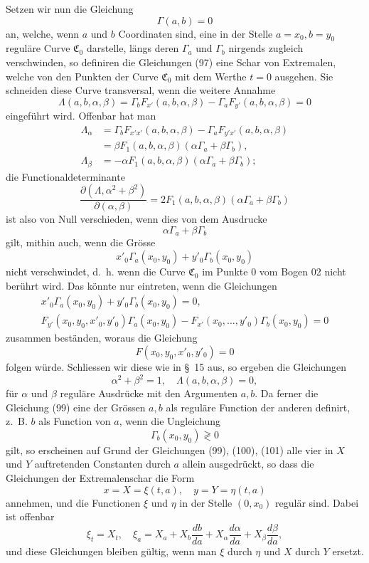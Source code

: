 \documentclass[11pt,a4paper,leqno]{article}
\begin{document}
Setzen wir nun die Gleichung
\begin{equation}\tag{99}
\Gamma(a,b)=0
\end{equation}
an, welche, wenn $a$ und $b$ Coordinaten sind, eine in der Stelle $a=x_0,b=y_0$ reguläre Curve $\mathfrak C_0$ darstelle, längs deren $\Gamma_a$ und $\Gamma_b$ nirgends zugleich verschwinden, so definiren die Gleichungen (97) eine Schar von Extremalen, welche von den Punkten der Curve $\mathfrak C_0$ mit dem Werthe $t=0$ ausgehen. Sie schneiden diese Curve transversal, wenn die weitere Annahme
\begin{equation}\tag{100}
\Lambda(a,b,\alpha,\beta)=\Gamma_bF_{x'}(a,b,\alpha,\beta)-\Gamma_aF_{y'}(a,b,\alpha,\beta)=0
\end{equation}
eingeführt wird. Offenbar hat man
\[
\begin{aligned}
\Lambda_{\alpha}
&=\Gamma_bF_{x'x'}(a,b,\alpha,\beta)-\Gamma_aF_{y'x'}(a,b,\alpha,\beta)\\
&=\beta F_1(a,b,\alpha,\beta)(\alpha\Gamma_a+
\beta\Gamma_b),\\
\Lambda_{\beta}
&=-\alpha F_1(a,b,\alpha,\beta)(\alpha\Gamma_a+
\beta\Gamma_b);
\end{aligned}
\]
die Functionaldeterminante
\[
\frac{\partial(\Lambda,\alpha^2+\beta^2)}{\partial(\alpha,\beta)}
=2F_1(a,b,\alpha,\beta)(\alpha\Gamma_a+
\beta\Gamma_b)
\]
ist also von Null verschieden, wenn dies von dem Ausdrucke
\[
\alpha\Gamma_a+\beta\Gamma_b
\]
gilt, mithin auch, wenn die Grösse
\[
x'_0\Gamma_a(x_0,y_0)+y'_0\Gamma_b(x_0,y_0)
\]
nicht verschwindet, d.~h. wenn die Curve $\mathfrak C_0$ im Punkte 0 vom Bogen 02 nicht berührt wird. Das könnte nur eintreten, wenn die Gleichungen
\[
\begin{gathered}
x'_0\Gamma_a(x_0,y_0)+y'_0\Gamma_b(x_0,y_0)=0,\\
F_{y'}(x_0,y_0,x'_0,y'_0)\Gamma_a(x_0,y_0)
-F_{x'}(x_0,\ldots,y'_0)\Gamma_b(x_0,y_0)=0
\end{gathered}
\]
zusammen beständen, woraus die Gleichung
\[
F(x_0,y_0,x'_0,y'_0)=0
\]
folgen würde. Schliessen wir diese wie in \S~15 aus, so ergeben die Gleichungen
\begin{equation}\tag{101}
\alpha^2+\beta^2=1,
\quad
\Lambda(a,b,\alpha,\beta)=0,
\end{equation}
für $\alpha$ und $\beta$ reguläre Ausdrücke mit den Argumenten $a,b$. Da ferner die Gleichung (99) eine der Grössen $a,b$ als reguläre Function der anderen definirt, z.~B. $b$ als Function von $a$, wenn die Ungleichung
\[
\Gamma_b(x_0,y_0)\gtrless0
\]
gilt, so erscheinen auf Grund der Gleichungen (99), (100), (101) alle vier in $X$ und $Y$ auftretenden Constanten durch $a$ allein ausgedrückt, so dass die Gleichungen der Extremalenschar die Form
\[
x=X=\xi(t,a),
\quad
y=Y=\eta(t,a)
\]
annehmen, und die Functionen $\xi$ und $\eta$ in der Stelle $(0,x_0)$ regulär sind. Dabei ist offenbar
\[
\xi_t=X_t,
\quad
\xi_a=X_a+X_b\frac{db}{da}+X_{\alpha}\frac{d\alpha}{da}+X_{\beta}\frac{d\beta}{da},
\]
und diese Gleichungen bleiben gültig, wenn man $\xi$ durch $\eta$ und $X$ durch $Y$ ersetzt.
\end{document}
